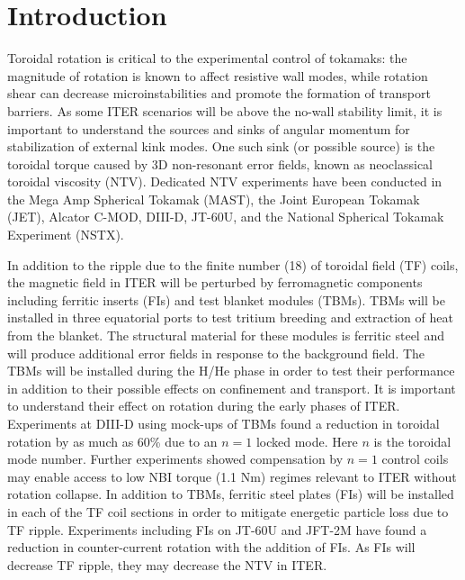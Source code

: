 \documentclass[aip, pop, preprint]{revtex4-1}
\begin{document}
\maketitle

\section{Introduction}

Toroidal rotation is critical to the experimental control of tokamaks: the magnitude of rotation is known to affect resistive wall modes,\cite{Bondeson1994, Garofalo2002} while rotation shear can decrease microinstabilities and promote the formation of transport barriers.\cite{Burrell1997, Terry2000} As some ITER scenarios will be above the no-wall stability limit,\cite{Liu2004} it is important to understand the sources and sinks of angular momentum for stabilization of external kink modes. One such sink (or possible source) is the toroidal torque caused by 3D non-resonant error fields, known as neoclassical toroidal viscosity (NTV). Dedicated NTV experiments have been conducted in the Mega Amp Spherical Tokamak (MAST),\cite{Hua2010} the Joint European Tokamak (JET),\cite{Lazzaro2002, DeVries2008b} Alcator C-MOD,\cite{Wolfe2005}  DIII-D,\cite{Garofalo2008,Reimerdes2009} JT-60U,\cite{Honda2014} and the National Spherical Tokamak Experiment (NSTX).\cite{Zhu2006} 

In addition to the ripple due to the finite number (18) of toroidal field (TF) coils, the magnetic field in ITER will be perturbed by ferromagnetic components including ferritic inserts (FIs) and test blanket modules (TBMs). TBMs will be installed in three equatorial ports to test tritium breeding and extraction of heat from the blanket. The structural material for these modules is ferritic steel and will produce additional error fields in response to the background field. The TBMs will be installed during the H/He phase in order to test their performance in addition to their possible effects on confinement and transport.\cite{Chuyanov2010} It is important to understand their effect on rotation during the early phases of ITER. Experiments at DIII-D using mock-ups of TBMs found a reduction in toroidal rotation by as much as 60\% due to an $n = 1$ locked mode.\cite{Schaffer2011} Here $n$ is the toroidal mode number. Further experiments showed compensation by $n=1$ control coils may enable access to low NBI torque (1.1 Nm) regimes relevant to ITER without rotation collapse.\cite{Lanctot2017} In addition to TBMs, ferritic steel plates (FIs) will be installed in each of the TF coil sections in order to mitigate energetic particle loss due to TF ripple.\cite{Tobita2003} Experiments including FIs on JT-60U\cite{Urano2007} and JFT-2M\cite{Kawashima2001} have found a reduction in counter-current rotation with the addition of FIs. As FIs will decrease TF ripple, they may decrease the NTV in ITER.
\end{document}
